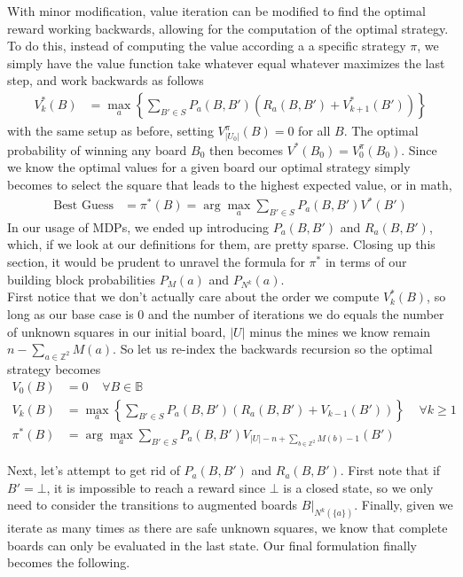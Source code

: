 With minor modification, value iteration can be modified to find the optimal reward working backwards, allowing for the computation of the optimal strategy. To do this, instead of computing the value according a a specific strategy $\pi$, we simply have the value function take whatever equal whatever maximizes the last step, and work backwards as follows
\begin{align*}
    V_k^*(B)&=\max_a\left\{\sum_{B'\in S}P_a(B,B')(R_a(B,B')+V_{k+1}^*(B'))\right\}
\end{align*}
with the same setup as before, setting $V_{|U_0|}^\pi(B)=0$ for all $B$. The optimal probability of winning any board $B_0$ then becomes $V^*(B_0)=V_0^\pi(B_0)$. Since we know the optimal values for a given board our optimal strategy simply becomes to select the square that leads to the highest expected value, or in math,
\begin{align*}
    \text{Best Guess}&=\pi^*(B)=\arg\max_a\sum_{B'\in S}P_a(B,B')V^*(B')
\end{align*}
In our usage of MDPs, we ended up introducing $P_a(B,B')$ and $R_a(B,B')$, which, if we look at our definitions for them, are pretty sparse. Closing up this section, it would be prudent to unravel the formula for $\pi^*$ in terms of our building block probabilities $P_M(a)$ and $P_{N^k}(a)$.\\

First notice that we don't actually care about the order we compute $V_k^*(B)$, so long as our base case is 0 and the number of iterations we do equals the number of unknown squares in our initial board, $|U|$ minus the mines we know remain $n-\sum_{a\in\mathbb{Z}^2}M(a)$. So let us re-index the backwards recursion so the optimal strategy becomes\begin{align*}
    V_0(B)&=0\;\;\;\;\forall B\in\mathbb{B}\\
    V_k(B)&=\max_a\left\{\sum_{B'\in S}P_a(B,B')(R_a(B,B')+V_{k-1}(B'))\right\}\;\;\;\;\forall k\geq1\\
    \pi^*(B)&=\arg\max_a\sum_{B'\in S}P_a(B,B')V_{|U|-n+\sum_{b\in\mathbb{Z}^2}M(b)-1}(B')
\end{align*}

Next, let's attempt to get rid of $P_a(B,B')$ and $R_a(B,B')$. First note that if $B'=\bot$, it is impossible to reach a reward since $\bot$ is a closed state, so we only need to consider the transitions to augmented boards $B|_{N^k(\{a\})}$. Finally, given we iterate as many times as there are safe unknown squares, we know that complete boards can only be evaluated in the last state. Our final formulation finally becomes the following.

